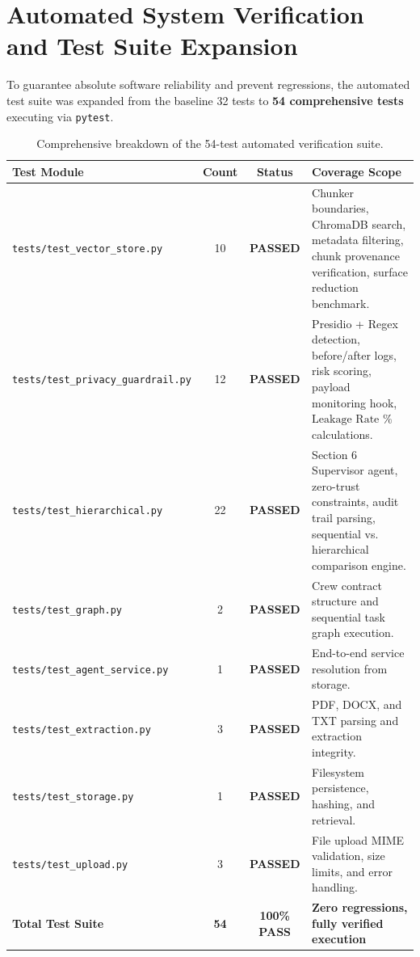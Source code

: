 \documentclass[10pt,a4paper]{article}
\begin{document}
\section{Automated System Verification and Test Suite Expansion}

To guarantee absolute software reliability and prevent regressions, the automated test suite was expanded from the baseline 32 tests to \textbf{54 comprehensive tests} executing via \texttt{pytest}.

\begin{table}[htbp]
\centering
\small
\begin{tabularx}{\textwidth}{p{6.0cm} c c X}
\toprule
\textbf{Test Module} & \textbf{Count} & \textbf{Status} & \textbf{Coverage Scope} \\
\midrule
\texttt{tests/test\_vector\_store.py} & 10 & \textbf{PASSED} & Chunker boundaries, ChromaDB search, metadata filtering, chunk provenance verification, surface reduction benchmark. \\
\texttt{tests/test\_privacy\_guardrail.py} & 12 & \textbf{PASSED} & Presidio + Regex detection, before/after logs, risk scoring, payload monitoring hook, $\text{Leakage Rate \%}$ calculations. \\
\texttt{tests/test\_hierarchical.py} & 22 & \textbf{PASSED} & Section 6 Supervisor agent, zero-trust constraints, audit trail parsing, sequential vs. hierarchical comparison engine. \\
\texttt{tests/test\_graph.py} & 2 & \textbf{PASSED} & Crew contract structure and sequential task graph execution. \\
\texttt{tests/test\_agent\_service.py} & 1 & \textbf{PASSED} & End-to-end service resolution from storage. \\
\texttt{tests/test\_extraction.py} & 3 & \textbf{PASSED} & PDF, DOCX, and TXT parsing and extraction integrity. \\
\texttt{tests/test\_storage.py} & 1 & \textbf{PASSED} & Filesystem persistence, hashing, and retrieval. \\
\texttt{tests/test\_upload.py} & 3 & \textbf{PASSED} & File upload MIME validation, size limits, and error handling. \\
\midrule
\textbf{Total Test Suite} & \textbf{54} & \textbf{100\% PASS} & \textbf{Zero regressions, fully verified execution} \\
\bottomrule
\end{tabularx}
\caption{Comprehensive breakdown of the 54-test automated verification suite.}
\label{tab:test_suite}
\end{table}
\end{document}

